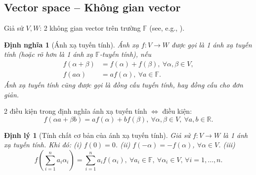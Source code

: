 \documentclass{article}
\newtheorem{dinhly}{Định lý}
\newtheorem{dinhnghia}{Định nghĩa}
\begin{document}
\subsection{Vector space -- Không gian vector}
Giả sử $V,W$: 2 không gian vector trên trường $\mathbb{F}$ (see, e.g., \cite[Chap. 2, \S2: Ánh xạ tuyến tính, pp. 100--110]{Hung_linear_algebra}).

\begin{dinhnghia}[Ánh xạ tuyến tính]
	Ánh xạ $f:V\to W$ được gọi là 1 \emph{ánh xạ tuyến tính} (hoặc rõ hơn là 1 \emph{ánh xạ $\mathbb{F}$-tuyến tính}), nếu
	\begin{align}
		f(\alpha + \beta) &= f(\alpha) + f(\beta),\ \forall\alpha,\beta\in V,\\
		f(a\alpha) &= af(\alpha),\ \forall a\in\mathbb{F}.
	\end{align}
	Ánh xạ tuyến tính cũng được gọi là \emph{đồng cấu tuyến tính}, hay \emph{đồng cấu} cho đơn giản.
\end{dinhnghia}
2 điều kiện trong định nghĩa ánh xạ tuyến tính $\Leftrightarrow$ điều kiện:
\begin{equation}
	f(\alpha a + \beta b) = af(\alpha) + bf(\beta),\ \forall\alpha,\beta\in V,\ \forall a,b\in\mathbb{R}.
\end{equation}

\begin{dinhly}[Tính chất cơ bản của ánh xạ tuyến tính]
	Giả sử $f:V\to W$ là 1 ánh xạ tuyến tính. Khi đó: (i) $f(0) = 0$. (ii) $f(-\alpha) = -f(\alpha)$, $\forall\alpha\in V$. (iii)
	\begin{equation}
		f\left(\sum_{i=1}^n a_i\alpha_i\right) = \sum_{i=1}^n a_if(\alpha_i),\ \forall a_i\in\mathbb{F},\ \forall\alpha_i\in V,\,\forall i = 1,\ldots,n.
	\end{equation}
\end{dinhly}
\end{document}
